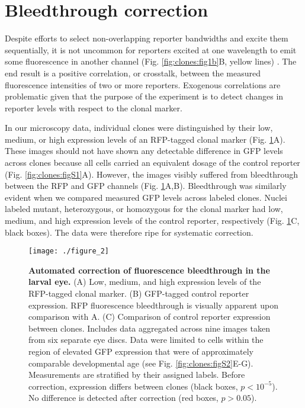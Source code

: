\section{Bleedthrough correction}
\label{ch:clones:correction}

Despite efforts to select non-overlapping reporter bandwidths and excite them sequentially, it is not uncommon for reporters excited at one wavelength to emit some fluorescence in another channel (Fig. \ref{fig:clones:fig1b}B, yellow lines) \cite{Bacia2012,Zinchuk2007}. The end result is a positive correlation, or crosstalk, between the measured fluorescence intensities of two or more reporters. Exogenous correlations are problematic given that the purpose of the experiment is to detect changes in reporter levels with respect to the clonal marker.

In our microscopy data, individual clones were distinguished by their low, medium, or high expression levels of an RFP-tagged clonal marker (Fig. \ref{fig:clones:fig2}A). These images should not have shown any detectable difference in GFP levels across clones because all cells carried an equivalent dosage of the control reporter (Fig. \ref{fig:clones:figS1}A). However, the images visibly suffered from bleedthrough between the RFP and GFP channels (Fig. \ref{fig:clones:fig2}A,B). Bleedthrough was similarly evident when we compared measured GFP levels across labeled clones. Nuclei labeled mutant, heterozygous, or homozygous for the clonal marker had low, medium, and high expression levels of the control reporter, respectively (Fig. \ref{fig:clones:fig2}C, black boxes). The data were therefore ripe for systematic correction.

\begin{figure}[t]
\centering
\texttt{[image: ./figure\_2]}
\caption[Automated correction of fluorescence bleedthrough in the larval eye.]{\textbf{Automated correction of fluorescence bleedthrough in the larval eye.} (A) Low, medium, and high expression levels of the RFP-tagged clonal marker. (B) GFP-tagged control reporter expression. RFP fluorescence bleedthrough is visually apparent upon comparison with A. (C) Comparison of control reporter expression between clones. Includes data aggregated across nine images taken from six separate eye discs. Data were limited to cells within the region of elevated GFP expression that were of approximately comparable developmental age (see Fig. \ref{fig:clones:figS2}E-G). Measurements are stratified by their assigned labels. Before correction, expression differs between clones (black boxes, $p<10^{-5}$). No difference is detected after correction (red boxes, $p>0.05$).}
\label{fig:clones:fig2}
\end{figure}


